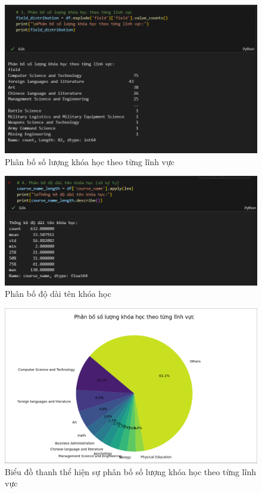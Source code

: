 \begin{figure}[h]
    \centering
    \includegraphics[width=1\linewidth]{figures/40.png}
    \caption{Phân bố số lượng khóa học theo từng lĩnh vực}
\end{figure}
\newpage
\begin{figure}
    \centering
    \includegraphics[width=0.85\linewidth]{figures/41.png}
    \caption{Phân bố độ dài tên khóa học}
\end{figure}
\begin{figure}[h]
    \centering
    \includegraphics[width=0.9\linewidth]{figures/42.png}
    \caption{Biểu đồ thanh thể hiện sự phân bố số lượng khóa học theo từng lĩnh vực}
\end{figure}
